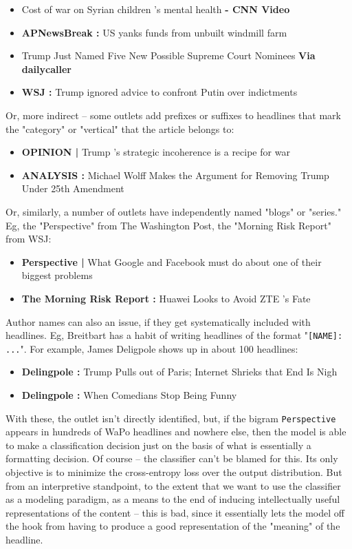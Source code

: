 \documentclass{scrartcl}
\begin{document}
\begin{itemize}
\item Cost of war on Syrian children 's mental health \textbf{- CNN Video}
\item \textbf{APNewsBreak :} US yanks funds from unbuilt windmill farm
\item Trump Just Named Five New Possible Supreme Court Nominees \textbf{Via dailycaller}
\item \textbf{WSJ :} Trump ignored advice to confront Putin over indictments
\end{itemize}

Or, more indirect -- some outlets add prefixes or suffixes to headlines that mark the "category" or "vertical" that the article belongs to:

\begin{itemize}
\item \textbf{OPINION |} Trump 's strategic incoherence is a recipe for war
\item \textbf{ANALYSIS :} Michael Wolff Makes the Argument for Removing Trump Under 25th Amendment
\end{itemize}

Or, similarly, a number of outlets have independently named "blogs" or "series." Eg, the "Perspective" from The Washington Post, the "Morning Risk Report" from WSJ:

\begin{itemize}
\item \textbf{Perspective |} What Google and Facebook must do about one of their biggest problems
\item \textbf{The Morning Risk Report :} Huawei Looks to Avoid ZTE 's Fate
\end{itemize}

Author names can also an issue, if they get systematically included with headlines. Eg, Breitbart has a habit of writing headlines of the format "\texttt{[NAME]: ...}". For example, James Deligpole shows up in about 100 headlines:

\begin{itemize}
\item \textbf{Delingpole :} Trump Pulls out of Paris; Internet Shrieks that End Is Nigh
\item \textbf{Delingpole :} When Comedians Stop Being Funny
\end{itemize}

With these, the outlet isn't directly identified, but, if the bigram \texttt{Perspective} appears in hundreds of WaPo headlines and nowhere else, then the model is able to make a classification decision just on the basis of what is essentially a formatting decision. Of course -- the classifier can't be blamed for this. Its only objective is to minimize the cross-entropy loss over the output distribution. But from an interpretive standpoint, to the extent that we want to use the classifier as a modeling paradigm, as a means to the end of inducing intellectually useful representations of the content -- this is bad, since it essentially lets the model off the hook from having to produce a good representation of the "meaning" of the headline.
\end{document}
